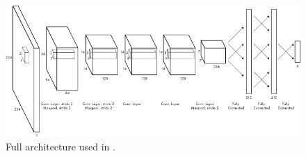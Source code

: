 \begin{figure}
	\centering
	\includegraphics[width=\textwidth]{img/related-work/cnn-architecture.png}
	\caption{Full architecture used in \parencite{Redmon2014}.}
	\label{fig:rel__cnn-arch}
\end{figure}
